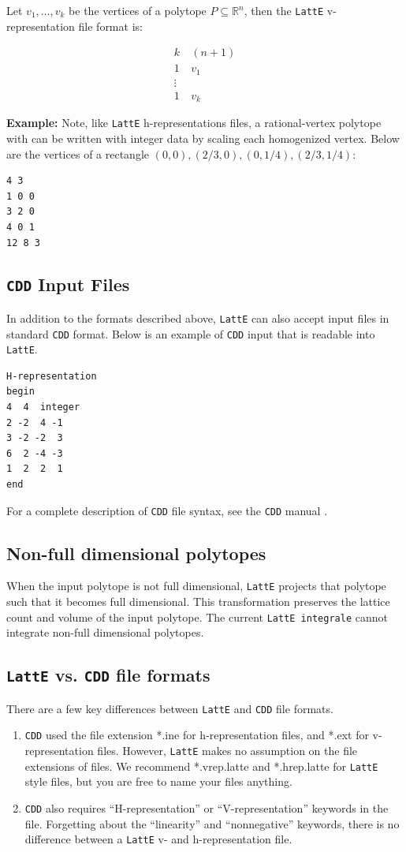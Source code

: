 \documentclass{article}
\newcommand{\R}{{\mathbb R}}
\newcommand{\latte}{{\tt LattE}\xspace}
\newcommand{\latteInt}{{\tt LattE integrale}\xspace}
\newcommand{\cdd}{{\tt CDD}\xspace}
\newcommand{\example}{{\bf Example:\space}}
\begin{document}
Let $v_1, \dots, v_k$ be the vertices of a polytope $P \subseteq \R^n$, then the \latte v-representation file format is:

\begin{align*}
	k &\: (n+1)\\
	1 &\: v_1\\
	\vdots & \\
	1 &\: v_k
\end{align*}


\example
Note, like \latte h-representations files, a rational-vertex polytope with can be written with integer data by scaling each homogenized vertex. Below are the vertices of a rectangle $(0,0), (2/3,0), (0,1/4), (2/3, 1/4)$:
\begin{verbatim}
4 3
1 0 0
3 2 0
4 0 1
12 8 3
\end{verbatim}

\subsection{\cdd Input Files}
In addition to the formats described above, {\tt LattE} can also
accept input files in standard \cdd format. Below is
an example of \cdd input that is readable into \latte.
\begin{verbatim}
H-representation
begin
4  4  integer
2 -2  4 -1
3 -2 -2  3
6  2 -4 -3
1  2  2  1
end
\end{verbatim}

For a complete description of \cdd file syntax, see the \cdd manual \cite{fukuda}.

\subsection{Non-full dimensional polytopes}

When the input polytope is not full dimensional, \latte projects that polytope such that it becomes full dimensional. This transformation preserves the lattice count and volume of the input polytope. The current \latteInt cannot integrate non-full dimensional polytopes.

\subsection{\latte vs. \cdd file formats}
There are a few key differences between \latte and \cdd file formats.

\begin{enumerate}
	\item \cdd used the file extension *.ine for h-representation files, and *.ext for v-representation files. However, \latte makes no assumption on the file extensions of files. We recommend *.vrep.latte and *.hrep.latte for \latte style files, but you are free to name your files anything.
	\item \cdd also requires ``H-representation'' or ``V-representation'' keywords in the file. Forgetting about the ``linearity'' and ``nonnegative'' keywords, there is no difference between a \latte v- and h-representation file.
\end{enumerate}
\end{document}
